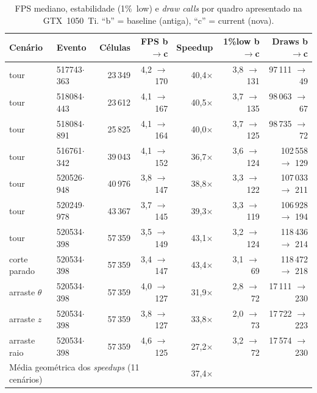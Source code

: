 \documentclass[11pt,a4paper]{article}
\begin{document}
\begin{table}[htbp]
\centering
\caption{FPS mediano, estabilidade (1\%~low) e \emph{draw calls} por quadro apresentado na
GTX~1050~Ti. ``b'' = baseline (antiga), ``c'' = current (nova).}
\label{tab:gtx}
\small
\begin{tabular}{llrrrrr}
\toprule
Cen\'ario & Evento & C\'elulas & FPS b$\to$c & Speedup & 1\%low b$\to$c & Draws b$\to$c \\
\midrule
tour & 517743$\cdot$363 & 23\,349 & 4{,}2 $\to$ 170 & 40{,}4$\times$ & 3{,}8 $\to$ 131 & 97\,111 $\to$ 49 \\
tour & 518084$\cdot$443 & 23\,612 & 4{,}1 $\to$ 167 & 40{,}5$\times$ & 3{,}7 $\to$ 135 & 98\,063 $\to$ 67 \\
tour & 518084$\cdot$891 & 25\,825 & 4{,}1 $\to$ 164 & 40{,}0$\times$ & 3{,}7 $\to$ 125 & 98\,735 $\to$ 72 \\
tour & 516761$\cdot$342 & 39\,043 & 4{,}1 $\to$ 152 & 36{,}7$\times$ & 3{,}6 $\to$ 124 & 102\,558 $\to$ 129 \\
tour & 520526$\cdot$948 & 40\,976 & 3{,}8 $\to$ 147 & 38{,}8$\times$ & 3{,}3 $\to$ 122 & 107\,033 $\to$ 211 \\
tour & 520249$\cdot$978 & 43\,367 & 3{,}7 $\to$ 145 & 39{,}3$\times$ & 3{,}3 $\to$ 119 & 106\,928 $\to$ 194 \\
tour & 520534$\cdot$398 & 57\,359 & 3{,}5 $\to$ 149 & 43{,}1$\times$ & 3{,}2 $\to$ 124 & 118\,436 $\to$ 214 \\
corte parado & 520534$\cdot$398 & 57\,359 & 3{,}4 $\to$ 147 & 43{,}4$\times$ & 3{,}1 $\to$ 69 & 118\,472 $\to$ 218 \\
arraste $\theta$ & 520534$\cdot$398 & 57\,359 & 4{,}0 $\to$ 127 & 31{,}9$\times$ & 2{,}8 $\to$ 72 & 17\,111 $\to$ 230 \\
arraste $z$ & 520534$\cdot$398 & 57\,359 & 3{,}8 $\to$ 127 & 33{,}8$\times$ & 2{,}0 $\to$ 73 & 17\,722 $\to$ 223 \\
arraste raio & 520534$\cdot$398 & 57\,359 & 4{,}6 $\to$ 125 & 27{,}2$\times$ & 3{,}2 $\to$ 72 & 17\,574 $\to$ 230 \\
\midrule
\multicolumn{4}{l}{M\'edia geom\'etrica dos \emph{speedups} (11 cen\'arios)} & 37{,}4$\times$ & & \\
\bottomrule
\end{tabular}
\end{table}
\end{document}
